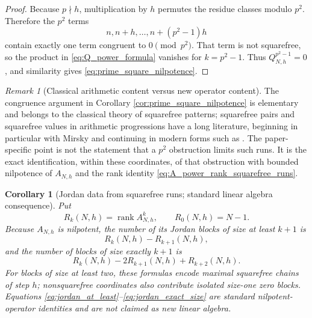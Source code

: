\documentclass[11pt]{amsart}
\numberwithin{equation}{section}
\theoremstyle{plain}
\newtheorem{corollary}[theorem]{Corollary}
\theoremstyle{definition}
\theoremstyle{remark}
\newtheorem{remark}[theorem]{Remark}
\DeclareMathOperator{\rank}{rank}
\begin{document}
\begin{proof}
Because $p\nmid h$, multiplication by $h$ permutes the residue classes modulo $p^2$.  Therefore the $p^2$ terms
\begin{equation}
n,n+h,\ldots,n+(p^2-1)h
\label{eq:p2_AP_window}
\end{equation}
contain exactly one term congruent to $0\pmod{p^2}$.  That term is not squarefree, so the product in \eqref{eq:Q_power_formula} vanishes for $k=p^2-1$.  Thus $Q_{N,h}^{p^2-1}=0$, and similarity gives \eqref{eq:prime_square_nilpotence}.
\end{proof}

\begin{remark}[Classical arithmetic content versus new operator content]
\label{rem:classical_squarefree_run}
The congruence argument in Corollary \ref{cor:prime_square_nilpotence} is elementary and belongs to the classical theory of squarefree patterns; squarefree pairs and squarefree values in arithmetic progressions have a long literature, beginning in particular with Mirsky \cite{Mirsky1949} and continuing in modern forms such as \cite{Nunes2015}.  The paper-specific point is not the statement that a $p^2$ obstruction limits such runs.  It is the exact identification, within these coordinates, of that obstruction with bounded nilpotence of $A_{N,h}$ and the rank identity \eqref{eq:A_power_rank_squarefree_runs}.
\end{remark}

\begin{corollary}[Jordan data from squarefree runs; standard linear algebra consequence]
\label{cor:jordan_squarefree_runs}
Put
\begin{equation}
R_k(N,h)=\rank A_{N,h}^k,
\qquad R_0(N,h)=N-1.
\label{eq:Rk_definition}
\end{equation}
Because $A_{N,h}$ is nilpotent, the number of its Jordan blocks of size at least $k+1$ is
\begin{equation}
R_k(N,h)-R_{k+1}(N,h),
\label{eq:jordan_at_least}
\end{equation}
and the number of blocks of size exactly $k+1$ is
\begin{equation}
R_k(N,h)-2R_{k+1}(N,h)+R_{k+2}(N,h).
\label{eq:jordan_exact_size}
\end{equation}
For blocks of size at least two, these formulas encode maximal squarefree chains of step $h$; nonsquarefree coordinates also contribute isolated size-one zero blocks.  Equations \eqref{eq:jordan_at_least}--\eqref{eq:jordan_exact_size} are standard nilpotent-operator identities and are not claimed as new linear algebra.
\end{corollary}
\end{document}
